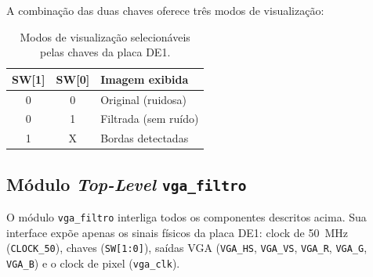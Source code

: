 \documentclass[12pt, a4paper]{article}
\begin{document}
	A combinação das duas chaves oferece três modos de visualização:
	
	\begin{table}[H]
		\centering
		\caption{Modos de visualização selecionáveis pelas chaves da placa DE1.}
		\label{tab:modos}
		\begin{tabular}{ccl}
			\toprule
			\textbf{SW[1]} & \textbf{SW[0]} & \textbf{Imagem exibida} \\
			\midrule
			0 & 0 & Original (ruidosa)      \\
			0 & 1 & Filtrada (sem ruído)    \\
			1 & X & Bordas detectadas       \\
			\bottomrule
		\end{tabular}
	\end{table}
	
	\subsection{Módulo \textit{Top-Level} \texttt{vga\_filtro}}
	
	O módulo \texttt{vga\_filtro} interliga todos os componentes descritos acima.
	Sua interface expõe apenas os sinais físicos da placa DE1: clock de 50~MHz
	(\texttt{CLOCK\_50}), chaves (\texttt{SW[1:0]}), saídas VGA (\texttt{VGA\_HS},
	\texttt{VGA\_VS}, \texttt{VGA\_R}, \texttt{VGA\_G}, \texttt{VGA\_B}) e o
	clock de pixel (\texttt{vga\_clk}).
	
\end{document}
